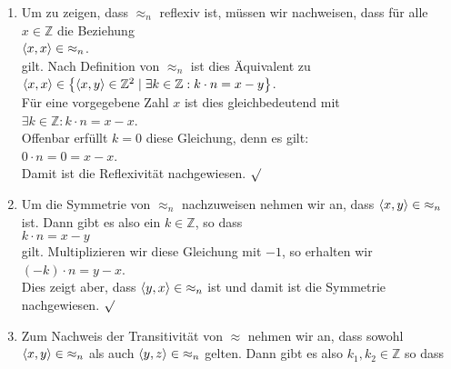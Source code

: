 \begin{enumerate}
\item Um zu zeigen, dass $\approx_n$ reflexiv ist, m\"{u}ssen wir nachweisen, dass f\"{u}r alle
      $x \in \mathbb{Z}$ die Beziehung
      \\[0.2cm]
      \hspace*{1.3cm}
      $\pair(x,x) \in\; \approx_n$.        
      \\[0.2cm]
      gilt.  Nach Definition von $\approx_n$
      ist dies \"{A}quivalent zu \\[0.2cm]
      \hspace*{1.3cm}
      $\pair(x,x) \in \bigl\{ \pair(x,y) \in \mathbb{Z}^2 \mid \exists k \in \mathbb{Z}: k \cdot n = x - y \bigr\}$.
      \\[0.2cm]
      F\"{u}r eine vorgegebene Zahl $x$ ist dies gleichbedeutend mit \\[0.2cm]
      \hspace*{1.3cm}
      $\exists k \in \mathbb{Z}: k \cdot n = x - x$.
      \\[0.2cm]
      Offenbar erf\"{u}llt $k=0$ diese Gleichung, denn es gilt: \\[0.2cm]
      \hspace*{1.3cm}
      $0\cdot n = 0 = x - x$. 
      \\[0.2cm]
      Damit ist die Reflexivit\"{a}t nachgewiesen. $\surd$
\item Um die Symmetrie von $\approx_n$ nachzuweisen nehmen wir an, dass 
      $\pair(x,y) \in\; \approx_n$ ist.  Dann gibt es also ein $k \in \mathbb{Z}$, so dass
      \\[0.2cm]
      \hspace*{1.3cm}      
      $k\cdot n = x - y$
      \\[0.2cm] 
      gilt.  Multiplizieren wir diese Gleichung mit $-1$, so erhalten wir
      \\[0.2cm]
      \hspace*{1.3cm}      
      $(-k)\cdot n = y - x$.
      \\[0.2cm]
      Dies zeigt aber, dass $\pair(y,x) \in\; \approx_n$ ist und damit ist die Symmetrie
      nachgewiesen. $\surd$
\item Zum Nachweis der Transitivit\"{a}t von $\approx$ nehmen wir an, dass
      sowohl $\pair(x,y) \in\; \approx_n$ als auch $\pair(y,z) \in\; \approx_n$
      gelten.  Dann gibt es also $k_1,k_2 \in \mathbb{Z}$ so dass 
      \\[0.2cm]
      \hspace*{1.3cm}      

\end{enumerate}
